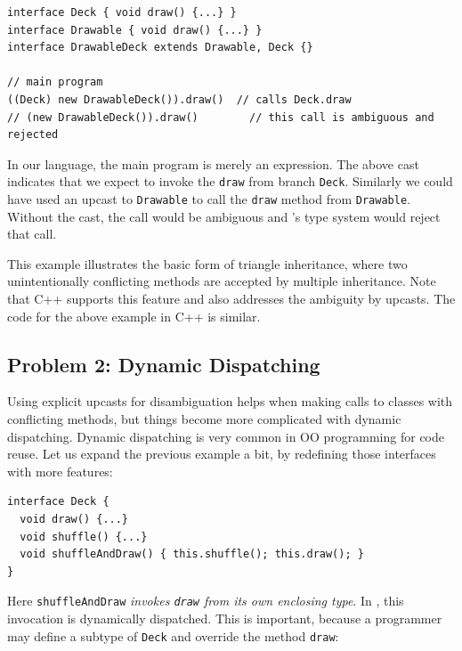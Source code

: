 \vspace{3pt}\begin{lstlisting}
interface Deck { void draw() {...} }
interface Drawable { void draw() {...} }
interface DrawableDeck extends Drawable, Deck {}

// main program
((Deck) new DrawableDeck()).draw()  // calls Deck.draw
// (new DrawableDeck()).draw()        // this call is ambiguous and rejected
\end{lstlisting}\vspace{3pt}
In our language, the main program is merely an expression. The above cast indicates
that we expect to invoke the \lstinline|draw| from branch
\lstinline|Deck|. Similarly we could have used an upcast to \lstinline|Drawable|
to call the \lstinline|draw| method from \lstinline|Drawable|.
Without the cast, the call would be ambiguous and
\MIM{}'s type system would reject that call. 

This example illustrates the basic form of triangle inheritance, where two unintentionally conflicting methods
are accepted by multiple inheritance. Note that C++ supports this feature and also addresses the
ambiguity by upcasts. The code for the above example in C++ is similar. 


\subsection{Problem 2: Dynamic Dispatching}\label{subsec:problem2}
Using explicit upcasts for disambiguation helps when making calls to
classes with conflicting methods, but things
become more complicated with dynamic dispatching. Dynamic
dispatching is very common in OO programming for code reuse. Let us expand the previous
example a bit, by redefining those interfaces with more features:

\vspace{3pt}\begin{lstlisting}
interface Deck {
  void draw() {...}
  void shuffle() {...}
  void shuffleAndDraw() { this.shuffle(); this.draw(); }
}
\end{lstlisting}\vspace{3pt}
Here \lstinline|shuffleAndDraw| \emph{invokes \lstinline|draw| from its own enclosing type}. In \MIM{}, this invocation is dynamically dispatched. This is important, because a programmer may define a subtype
of \lstinline|Deck| and override the method \lstinline|draw|:

